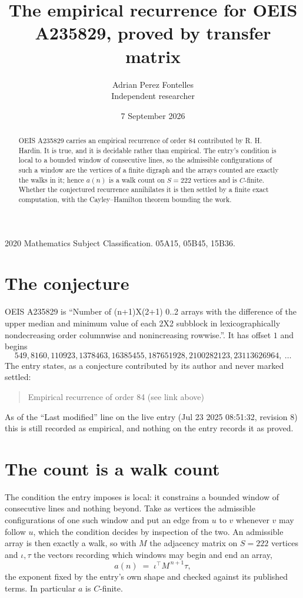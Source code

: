 \documentclass[11pt,a4paper]{article}
\title{The empirical recurrence for OEIS A235829, proved by transfer matrix}
\author{Adrian Perez Fontelles\\ \small Independent researcher}
\date{7 September 2026}
\theoremstyle{plain}
\theoremstyle{definition}
\begin{document}
\maketitle

\begin{abstract}
OEIS A235829 carries an empirical recurrence of order $84$ contributed by R. H. Hardin. It is
true, and it is decidable rather than empirical. The entry's condition is local to a bounded window of consecutive lines, so
the admissible configurations of such a window are the vertices of a finite digraph and the
arrays counted are exactly the walks in it; hence $a(n)$ is a walk count on $S=222$ vertices
and is $C$-finite. Whether the conjectured recurrence annihilates it is then settled by a
finite exact computation, with the Cayley--Hamilton theorem bounding the work.
\end{abstract}

\noindent\small 2020 Mathematics Subject Classification. 05A15, 05B45, 15B36.\normalsize

\section{The conjecture}

OEIS A235829 is ``Number of (n+1)X(2+1) 0..2 arrays with the difference of the upper median and minimum value of each 2X2 subblock in lexicographically nondecreasing order columnwise and nonincreasing rowwise.''. It has offset $1$ and begins
\[
549, 8160, 110923, 1378463, 16385455, 187651928, 2100282123, 23113626964,\ \dots
\]
The entry states, as a conjecture contributed by its author and never marked settled:
\begin{quote}
Empirical recurrence of order 84 (see link above)
\end{quote}
As of the ``Last modified'' line on the live entry (Jul 23 2025 08:51:32, revision 8) this is still
recorded as empirical, and nothing on the entry records it as proved.

\section{The count is a walk count}

The condition the entry imposes is local: it constrains a bounded window of consecutive lines and nothing beyond. Take as
vertices the admissible configurations of one such window and put an edge from $u$ to $v$
whenever $v$ may follow $u$, which the condition decides by inspection of the two. An
admissible array is then exactly a walk, so with $M$ the adjacency matrix on $S=222$ vertices
and $\iota,\tau$ the vectors recording which windows may begin and end an array,
\[
a(n)\;=\;\iota^{\!\top}M^{\,n+1}\tau ,
\]
the exponent fixed by the entry's own shape and checked against its published terms. In
particular $a$ is $C$-finite.
\end{document}
